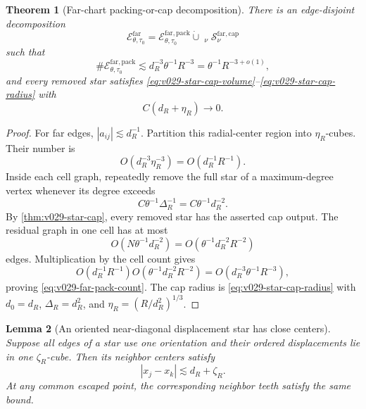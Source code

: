 \documentclass[10pt]{article}
\newtheorem{theorem}{Theorem}[section]
\newtheorem{lemma}[theorem]{Lemma}
\begin{document}
\begin{theorem}[Far-chart packing-or-cap decomposition]
\label{thm:v029-far-decomposition}
There is an edge-disjoint decomposition
\begin{equation}
\label{eq:v029-far-edge-decomposition}
\boxed{
\mathcal E_{\theta,\tau_0}^{\mathrm{far}}
=
\mathcal E_{\theta,\tau_0}^{\mathrm{far,pack}}
\mathbin{\dot\cup}
\mathop{\dot\bigcup}_{\nu}
\mathcal S_{\nu}^{\mathrm{far,cap}}
}
\end{equation}
such that
\begin{equation}
\label{eq:v029-far-pack-count}
\boxed{
\#\mathcal E_{\theta,\tau_0}^{\mathrm{far,pack}}
\lesssim
d_R^{-3}\theta^{-1}R^{-3}
=
\theta^{-1}R^{-3+o(1)},
}
\end{equation}
and every removed star satisfies
\eqref{eq:v029-star-cap-volume}--\eqref{eq:v029-star-cap-radius} with
\begin{equation}
\label{eq:v029-far-cap-radius}
\boxed{
C(d_R+\eta_R)
\longrightarrow
0.
}
\end{equation}
\end{theorem}

\begin{proof}
For far edges, \(|a_{ij}|\lesssim d_R^{-1}\).  Partition this radial-center region into
\(\eta_R\)-cubes.  Their number is
\[
O(d_R^{-3}\eta_R^{-3})
=
O(d_R^{-1}R^{-1}).
\]
Inside each cell graph, repeatedly remove the full star of a maximum-degree vertex whenever its
degree exceeds
\[
C\theta^{-1}\Delta_R^{-1}
=
C\theta^{-1}d_R^{-2}.
\]
By
\cref{thm:v029-star-cap}, every removed star has the asserted cap output.  The residual graph in one
cell has at most
\[
O(N\theta^{-1}d_R^{-2})
=
O(\theta^{-1}d_R^{-2}R^{-2})
\]
edges.  Multiplication by the cell count gives
\[
O(d_R^{-1}R^{-1})
O(\theta^{-1}d_R^{-2}R^{-2})
=
O(d_R^{-3}\theta^{-1}R^{-3}),
\]
proving
\eqref{eq:v029-far-pack-count}.  The cap radius is
\eqref{eq:v029-star-cap-radius} with
\(d_0=d_R\), \(\Delta_R=d_R^2\), and
\(\eta_R=(R/d_R^2)^{1/3}\).
\end{proof}

\begin{lemma}[An oriented near-diagonal displacement star has close centers]
\label{lem:v029-near-center-cluster}
Suppose all edges of a star use one orientation and their ordered displacements lie in one
\(\zeta_R\)-cube.  Then its neighbor centers satisfy
\begin{equation}
\label{eq:v029-near-center-cluster}
\boxed{
|x_j-x_k|
\lesssim
d_R+\zeta_R.
}
\end{equation}
At any common escaped point, the corresponding neighbor teeth satisfy the same bound.
\end{lemma}
\end{document}
